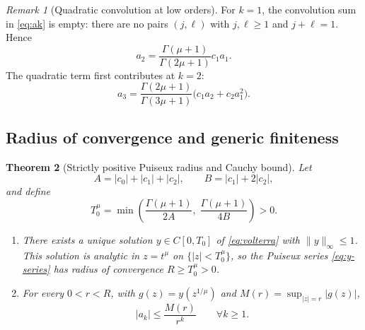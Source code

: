 \documentclass[11pt]{article}
\newtheorem{theorem}{Theorem}[section]
\theoremstyle{definition}
\theoremstyle{remark}
\newtheorem{remark}[theorem]{Remark}
\begin{document}
\begin{remark}[Quadratic convolution at low orders]
\label{rem:conv-low}
For $k=1$, the convolution sum in \eqref{eq:ak} is empty: there are no pairs $(j,\ell)$ with $j,\ell\ge 1$ and $j+\ell=1$. Hence
\begin{equation}
a_{2}=\frac{\Gamma(\mu+1)}{\Gamma(2\mu+1)}c_{1}a_{1}.
\label{eq:a2}
\end{equation}
The quadratic term first contributes at $k=2$:
\begin{equation}
a_{3}=\frac{\Gamma(2\mu+1)}{\Gamma(3\mu+1)}\bigl(c_{1}a_{2}+c_{2}a_{1}^{2}\bigr).
\label{eq:a3}
\end{equation}
\end{remark}

\subsection{Radius of convergence and generic finiteness}
\label{sec:heston-radius}

\begin{theorem}[Strictly positive Puiseux radius and Cauchy bound]
\label{thm:radius}
Let
\begin{equation}
A=|c_{0}|+|c_{1}|+|c_{2}|,\qquad B=|c_{1}|+2|c_{2}|,
\label{eq:AB}
\end{equation}
and define
\begin{equation}
T_{0}^{\mu}=\min\!\left(\frac{\Gamma(\mu+1)}{2A},\;\frac{\Gamma(\mu+1)}{4B}\right)>0.
\label{eq:T0}
\end{equation}
\begin{enumerate}[label=(\roman*)]
\item There exists a unique solution $y\in C[0,T_{0}]$ of \eqref{eq:volterra} with $\|y\|_{\infty}\le 1$. This solution is analytic in $z=t^{\mu}$ on $\{|z|<T_{0}^{\mu}\}$, so the Puiseux series \eqref{eq:y-series} has radius of convergence $R\ge T_{0}^{\mu}>0$.
\item For every $0<r<R$, with $g(z)=y(z^{1/\mu})$ and $M(r)=\sup_{|z|=r}|g(z)|$,
\begin{equation}
|a_{k}|\le \frac{M(r)}{r^{k}}\qquad \forall k\ge 1.
\label{eq:cauchy-bound}
\end{equation}
\end{enumerate}
\end{theorem}
\end{document}
